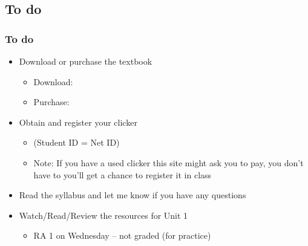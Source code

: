 \documentclass[11pt,containsverbatim,handout,xcolor=xelatex,dvipsnames,table]{beamer}
\begin{document}

\subsection{To do}


\begin{frame}
\frametitle{To do}

\begin{itemize}

\item Download or purchase the textbook
\begin{itemize}
\item Download: 
\item Purchase: 
\end{itemize}

\item Obtain and register your clicker
\begin{itemize}
\item {} (Student ID = Net ID) 
\item Note: If you have a used clicker this site might ask you to pay, you don't have to
you'll get a chance to register it in class
\end{itemize}

\item Read the syllabus and let me know if you have any questions

\item Watch/Read/Review the resources for Unit 1
\begin{itemize}
\item RA 1 on Wednesday -- not graded (for practice)
\end{itemize}

\end{itemize}

\end{frame}

\end{document}
